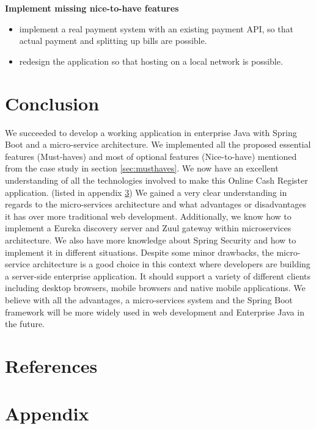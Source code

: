 \documentclass[12pt]{article}
\begin{document}
\begin{multicols}{2}
\\\\
\noindent\textbf{Implement missing nice-to-have features}
\begin{itemize}
	\item implement a real payment system with an existing payment API, so that actual payment and splitting up bills are possible.
	\item redesign the application so that hosting on a local network is possible.
\end{itemize}

\section{Conclusion}
We succeeded to develop a working application in enterprise Java with Spring Boot and a micro-service architecture. We implemented all the proposed essential features (Must-haves) and most of optional features (Nice-to-have) mentioned from the case study in section \ref{sec:musthaves}. We now have an excellent understanding of all the technologies  involved to make this Online Cash Register application. (listed in appendix \ref{sec:techlist}) We gained a very clear understanding in regards to the micro-services architecture and what advantages or disadvantages it has over more traditional web development. Additionally, we know how to implement a Eureka discovery server and Zuul gateway within microservices architecture. We also have more knowledge about Spring Security and how to implement it in different situations. Despite some minor drawbacks, the micro-service architecture is a good choice in this context where developers are building a server-side enterprise application. It should support a variety of different clients including desktop browsers, mobile browsers and native mobile applications. We believe with all the advantages, a micro-services system and the Spring Boot framework will be more  widely used in web development and Enterprise Java in the future.


\end{multicols}

\newpage
\section{References}




\newpage
\section{Appendix}
\label{sec:techlist}
\end{document}
